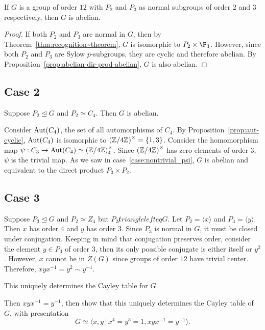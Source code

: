 \begin{corollary}
  If $G$ is a group of order $12$ with $P_2$ and $P_3$ as normal subgroups
  of order $2$ and $3$ respectively, then $G$ is abelian.
  
  \begin{proof}
    If both $P_2$ and $P_3$ are normal in $G$,
    then by Theorem~\ref{thm:recognition~theorem}, $G$ is isomorphic to $P_2 \times \P_3$.
    However, since both $P_2$ and $P_3$ are Sylow $p$-subgroups, they are cyclic
    and therefore abelian.
    By Proposition~\ref{prop:abelian-dir-prod-abelian}, $G$ is also abelian.
  \end{proof}
\end{corollary}

\subsection*{Case 2} Suppose $P_2 \trianglelefteq G$ and $P_2 \simeq C_4$.
Then $G$ is abelian.

Consider $\operatorname{Aut}(C_4)$, the set of all automorphisms of $C_4$.
By Proposition~\ref{prop:aut-cyclic}, $\operatorname{Aut}(C_4)$ is isomorphic to
${(\mathbb{Z}/4\mathbb{Z})}^\times = \{ 1, 3 \}$.
Consider the homomorphism map $\psi : C_3 \to \operatorname{Aut}(C_4) \simeq {(\mathbb{Z}/4\mathbb{Z})}_4^\times$.
Since ${(\mathbb{Z}/4\mathbb{Z})}^\times$ has zero elements of order $3$,
$\psi$ is the trivial map. As we saw in case~\ref{case:nontrivial_psi},
$G$ is abelian and equivalent to the direct product $P_3 \times P_2$.

\subsection*{Case 3} Suppose $P_3 \trianglelefteq G$ and $P_2 \simeq Z_4$
but $P_2 \not trianglelefteq G$.
Let $P_2=\langle x \rangle$ and $P_3=\langle y \rangle$.
Then $x$ has order $4$ and $y$ has order $3$.
Since $P_3$ is normal in $G$, it must be closed under conjugation.
Keeping in mind that conjugation preserves order,
consider the element $y \in P_3$ of order $3$,
then its only possible conjugate is either itself or $y^2$.
However, $x$ cannot be in $Z(G)$ since groups of order $12$
have trivial center. Therefore, $xyx^{-1} = y^2 \sim y^{-1}$.

This uniquely determines the Cayley table for $G$.


Then $xyx^{-1}=y^{-1}$, then show that this uniquely determines the Cayley 
table of $G$, with presentation
\[ G \simeq \langle x,y \,|\, x^4=y^3=1, xyx^{-1}=y^{-1} \rangle. \]

